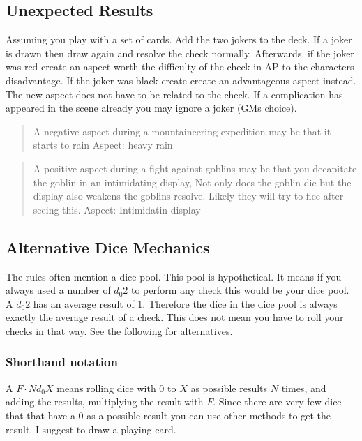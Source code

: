 \documentclass[11pt]{article}
\begin{document}
{\subsection{Unexpected Results}
\label{sec:org441e5f0}
Assuming you play with a set of cards. Add the two jokers to the deck. If a joker is drawn then draw again and resolve the check normally. Afterwards, if the joker was red create an aspect worth the difficulty of the check in AP to the characters disadvantage. If the joker was black create create an advantageous aspect instead. The new aspect does not have to be related to the check.
If a complication has appeared in the scene already you may ignore a joker (GMs choice).

\begin{quote}
A negative aspect during a mountaineering expedition may be that it starts to rain
Aspect: heavy rain
\end{quote}

\begin{quote}
A positive aspect during a fight against goblins may be that you decapitate the goblin in an intimidating display, Not only does the goblin die but the display also weakens the goblins resolve. Likely they will try to flee after seeing this.
Aspect: Intimidatin display
\end{quote}

\subsection{Alternative Dice Mechanics}
\label{sec:org411da3b}
The rules often mention a dice pool. This pool is hypothetical. It means if you always used a number of  \(d_0 2\) to perform any check this would be your dice pool. A \(d_0 2\) has an average result of \(1\). Therefore the dice in the dice pool is always exactly the average result of a check. This does not mean you have to roll your checks in that way. See the following for alternatives.

\subsubsection{Shorthand notation}
\label{sec:org9a0515f}

A \(F \cdot N d_0 X\) means rolling dice with \(0\) to \(X\) as possible results \(N\) times, and adding the results, multiplying the result with \(F\). Since there are very few dice that that have a 0 as a possible result you can use other methods to get the result. I suggest to draw a playing card.

}
\end{document}
